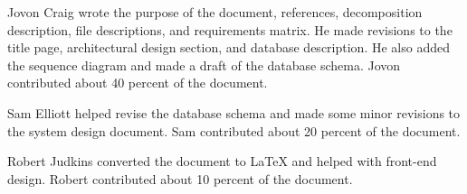 \documentclass{article}
\begin{document}
Jovon Craig wrote the purpose of the document, references, decomposition description, file descriptions, and requirements matrix. He made revisions to the title page, architectural design section, and database description. He also added the sequence diagram and made a draft of the database schema. Jovon contributed about 40 percent of the document.

Sam Elliott helped revise the database schema and made some minor revisions to the system design document. Sam contributed about 20 percent of the document.

Robert Judkins converted the document to LaTeX and helped with front-end design. Robert contributed about 10 percent of the document.
\end{document}
